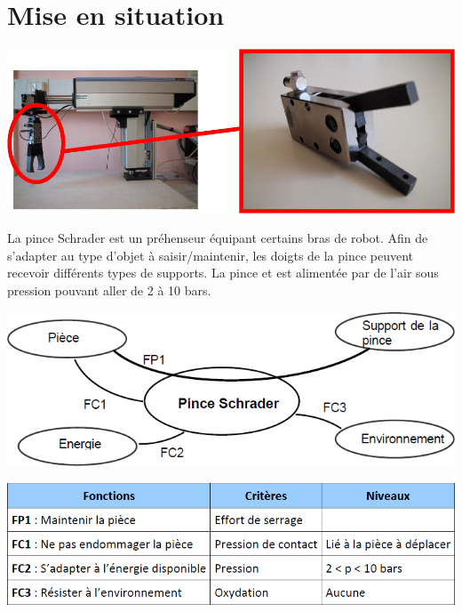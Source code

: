 \documentclass[11pt,oneside]{article}
\begin{document}
\section*{Mise en situation}
\begin{center}
\includegraphics[width=.9\textwidth]{png/fig1}
\end{center}

La pince Schrader est un préhenseur équipant certains bras de robot. Afin de s’adapter au type
d’objet à saisir/maintenir, les doigts de la pince peuvent recevoir différents types de supports.
La pince et est alimentée par de l’air sous pression pouvant aller de 2 à 10 bars.

\begin{minipage}[c]{.45\linewidth}
\begin{center}
\includegraphics[width=\textwidth]{png/fig2}
\end{center}
\end{minipage} \hfill
\begin{minipage}[c]{.45\linewidth}
\begin{center}
\includegraphics[width=\textwidth]{png/fig3}
\end{center}
\end{minipage}
\end{document}

